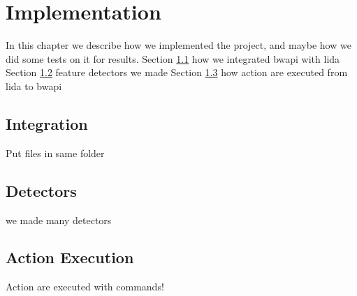 
\chapter{Implementation}
In this chapter we describe how we implemented the project, and maybe how we did some tests on it for results. 
Section \ref{sec:integration} how we integrated bwapi with lida
Section \ref{sec:detectors} feature detectors we made
Section \ref{sec:actionexecution} how action are executed from lida to bwapi



\section{Integration}
\label{sec:integration}
Put files in same folder

\section{Detectors}
\label{sec:detectors}
we made many detectors

\section{Action Execution}
\label{sec:actionexecution}
Action are executed with commands!
